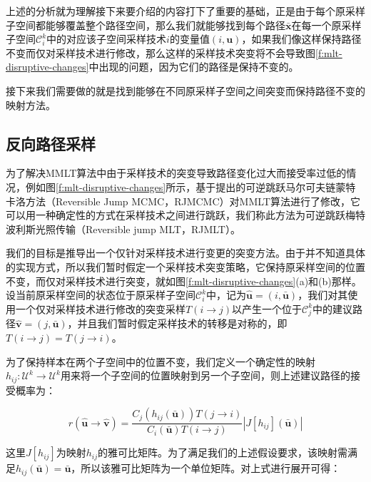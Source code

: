 上述的分析就为理解接下来要介绍的内容打下了重要的基础，正是由于每个原采样子空间都能够覆盖整个路径空间，那么我们就能够找到每个路径$\bar{\mathbf{x}}$在每一个原采样子空间$\mathscr{C}^{k}_i$中的对应该子空间采样技术$i$的变量值$(i,\mathbf{u})$，如果我们像这样保持路径不变而仅对采样技术进行修改，那么这样的采样技术突变将不会导致图\ref{f:mlt-disruptive-changes}中出现的问题，因为它们的路径是保持不变的。

接下来我们需要做的就是找到能够在不同原采样子空间之间突变而保持路径不变的映射方法。




\subsection{反向路径采样}
为了解决MMLT算法中由于采样技术的突变导致路径变化过大而接受率过低的情况，例如图\ref{f:mlt-disruptive-changes}所示，\cite{a:ReversibleJumpMetropolisLightTransportusingInverseMappings}基于\cite{a:ReversiblejumpMarkovchainMonteCarlocomputationandBayesianmodeldetermination}提出的可逆跳跃马尔可夫链蒙特卡洛方法（Reversible Jump MCMC，RJMCMC）对MMLT算法进行了修改，它可以用一种确定性的方式在采样技术之间进行跳跃，我们称此方法为可逆跳跃梅特波利斯光照传输（Reversible jump MLT，RJMLT）。

我们的目标是推导出一个仅针对采样技术进行变更的突变方法。由于并不知道具体的实现方式，所以我们暂时假定一个采样技术突变策略，它保持原采样空间的位置不变，而仅对采样技术进行突变，就如图\ref{f:mlt-disruptive-changes}(a)和(b)那样。设当前原采样空间的状态位于原采样子空间$\mathscr{C}^{k}_i$中，记为$\hat{\mathbf{u}}=(i,\bar{\mathbf{u}})$，我们对其使用一个仅对采样技术进行修改的突变采样$T(i\to j)$以产生一个位于$\mathscr{C}^{k}_j$中的建议路径$\hat{\mathbf{v}}=(j,\bar{\mathbf{u}})$，并且我们暂时假定采样技术的转移是对称的，即$T(i\to j)=T(j\to i)$。

为了保持样本在两个子空间中的位置不变，我们定义一个确定性的映射$h_{ij}:\mathcal{U}^{k}\to\mathcal{U}^{k}$用来将一个子空间的位置映射到另一个子空间，则上述建议路径的接受概率为：

\begin{equation}
	r(\hat{\mathbf{u}}\to\hat{\mathbf{v}})=\frac{C_j(h_{ij}(\bar{\mathbf{u}}))T(j\to i)}{C_i(\bar{\mathbf{u}})T(i\to j)}|J[h_{ij}](\bar{\mathbf{u}})|
\end{equation}

\noindent 这里$J[h_{ij}]$为映射$h_{ij}$的雅可比矩阵。为了满足我们的上述假设要求，该映射需满足$h_{ij}(\bar{\mathbf{u}})=\bar{\mathbf{u}}$，所以该雅可比矩阵为一个单位矩阵。对上式进行展开可得：

